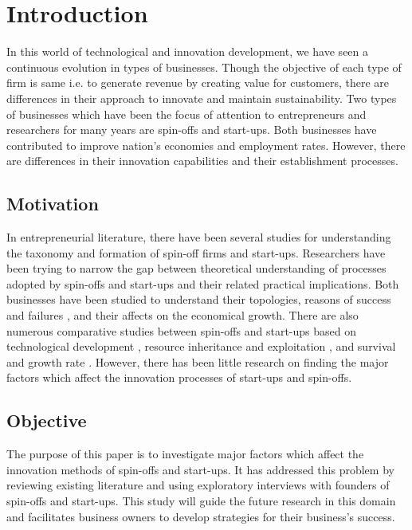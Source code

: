 \chapter{Introduction\label{cha:chapter1}}

In this world of technological and innovation development, we have seen a continuous
evolution in types of businesses. Though the objective of each type of firm is same i.e. to generate
revenue by creating value for customers, there are differences in their approach to innovate and
maintain sustainability. Two types of businesses which have been the focus of attention to
entrepreneurs and researchers for many years are spin-offs and start-ups. Both businesses have contributed to
improve nation’s economies and employment rates. However, there are differences in their
innovation capabilities and their establishment processes.


\section{Motivation\label{sec:moti}}
In entrepreneurial literature, there have been several studies for understanding the taxonomy and formation of spin-off firms and start-ups.
Researchers have been trying to narrow the gap between theoretical understanding of processes adopted by spin-offs and start-ups and their related practical implications. Both businesses have been studied to understand their topologies, reasons of success and failures \cite{fastcompany}, and their affects on
the economical growth\cite{economical_growth}. There are also numerous comparative studies between spin-offs and
start-ups based on technological development \cite{comparative_studies}, resource inheritance and exploitation \cite{resource_inheritance}, and
survival and growth rate \cite{whose_child}. However, there has been little research on finding the major factors which
affect the innovation processes of start-ups and spin-offs.

\section{Objective\label{sec:objective}}
The purpose of this paper is to investigate major factors which affect the innovation methods of
spin-offs and start-ups. It has addressed this problem by reviewing existing literature and using
exploratory interviews with founders of spin-offs and start-ups. This study will guide the future research in this domain and facilitates business owners to
develop strategies for their business’s success.


